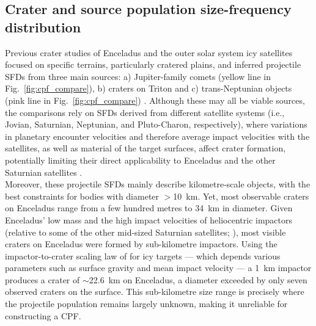 \documentclass[preprint,11pt,3p,times,authoryear]{elsarticle}
\begin{document}
\subsection{Crater and source population size-frequency distribution}
Previous crater studies of Enceladus and the outer solar system icy satellites focused on specific terrains, particularly cratered plains, and inferred projectile SFDs from three main sources:
a) Jupiter-family comets (yellow line in Fig.~\ref{fig:cpf_compare}), b) craters on Triton 
and c) trans-Neptunian objects (pink line in Fig.~\ref{fig:cpf_compare}) \citep{Zahnle2003, Singer2019, Bottke2024}.
Although these may all be viable sources, the comparisons rely on SFDs derived from different satellite systems (i.e., Jovian, Saturnian, Neptunian, and Pluto-Charon, respectively), where variations in planetary encounter velocities and therefore average impact velocities with the satellites, as well as material of the target surfaces, affect crater formation, potentially limiting their direct applicability to Enceladus and the other Saturnian satellites \citep{Neukum1983,Zahnle2003,DiSisto2007,DiSisto2011,DiSisto2013,DiSisto2016,Rossignoli2019,DiSisto2020,Rossignoli2022}.\\

Moreover, these projectile SFDs mainly describe kilometre-scale objects, with the best constraints for bodies with diameter $>$10~km. Yet, most observable craters on Enceladus range from a few hundred metres to 34~km in diameter. Given Enceladus’ low mass and the high impact velocities of heliocentric impactors (relative to some of the other mid-sized Saturnian satellites; \citealt{Zahnle2003, Wong2021}), most visible craters on Enceladus were formed by sub-kilometre impactors. Using the impactor-to-crater scaling law of \citet{Zahnle2003} for icy targets --- which depends various parameters such as surface gravity and mean impact velocity --- a 1~km impactor produces a crater of $\sim$22.6~km on Enceladus, a diameter exceeded by only seven observed craters on the surface. This sub-kilometre size range is precisely where the projectile population remains largely unknown, making it unreliable for constructing a CPF. \\
\end{document}
